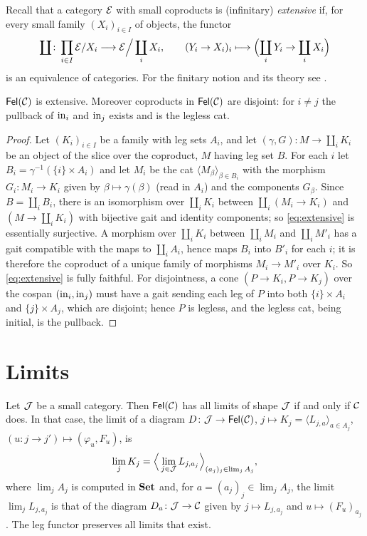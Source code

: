 Recall that a category $\mathcal{E}$ with small coproducts is (infinitary)
\emph{extensive} if, for every small family $(X_i)_{i\in I}$ of objects, the
functor
\begin{equation}\label{eq:extensive}
\coprod\colon\prod_{i\in I}\mathcal{E}/X_i\longrightarrow\mathcal{E}\Big/\coprod_iX_i,\qquad (Y_i\to X_i)_i\longmapsto\Bigl(\coprod_iY_i\to\coprod_iX_i\Bigr)
\end{equation}
is an equivalence of categories. For the finitary notion and its theory see
\cite{CarboniLackWalters1993}.

\begin{proposition}\label{prop:extensive}
$\mathsf{Fel}(\mathcal{C})$ is extensive. Moreover coproducts in $\mathsf{Fel}(\mathcal{C})$ are disjoint: for
$i\neq j$ the pullback of $\mathrm{in}_i$ and $\mathrm{in}_j$ exists and is the legless cat.
\end{proposition}

\begin{proof}
Let $(K_i)_{i\in I}$ be a family with leg sets $A_i$, and let
$(\gamma,G)\colon M\to\coprod_iK_i$ be an object of the slice over the
coproduct, $M$ having leg set $B$. For each $i$ let $B_i=\gamma^{-1}(\{i\}\times A_i)$
and let $M_i$ be the cat $\langle M_\beta\rangle_{\beta\in B_i}$ with the morphism
$G_i\colon M_i\to K_i$ given by $\beta\mapsto\gamma(\beta)$ (read in $A_i$) and
the components $G_\beta$. Since $B=\coprod_iB_i$, there is an isomorphism over
$\coprod_iK_i$ between $\coprod_i(M_i\to K_i)$ and $(M\to\coprod_iK_i)$ with
bijective gait and identity components; so \eqref{eq:extensive} is essentially
surjective. A morphism over $\coprod_iK_i$ between $\coprod_iM_i$ and
$\coprod_iM'_i$ has a gait compatible with the maps to $\coprod_iA_i$, hence
maps $B_i$ into $B'_i$ for each $i$; it is therefore the coproduct of a unique
family of morphisms $M_i\to M'_i$ over $K_i$. So \eqref{eq:extensive} is fully
faithful. For disjointness, a cone $(P\to K_i,P\to K_j)$ over the cospan
$(\mathrm{in}_i,\mathrm{in}_j)$ must have a gait sending each leg of $P$ into both
$\{i\}\times A_i$ and $\{j\}\times A_j$, which are disjoint; hence $P$ is
legless, and the legless cat, being initial, is the pullback.
\end{proof}

\section{Limits}\label{sec:limits}

\begin{theorem}\label{thm:limits}
Let $\mathcal{J}$ be a small category. Then $\mathsf{Fel}(\mathcal{C})$ has all limits of shape $\mathcal{J}$
if and only if $\mathcal{C}$ does. In that case, the limit of a diagram
$D\colon\mathcal{J}\to\mathsf{Fel}(\mathcal{C})$, $j\mapsto K_j=\langle L_{j,a}\rangle_{a\in A_j}$,
$(u\colon j\to j')\mapsto(\varphi_u,F_u)$, is
\[
\lim_{j}K_j=\Bigl\langle\,\lim_{j\in\mathcal{J}}L_{j,a_j}\Bigr\rangle_{(a_j)_j\in\lim_jA_j},
\]
where $\lim_jA_j$ is computed in $\mathbf{Set}$ and, for $a=(a_j)_j\in\lim_jA_j$, the
limit $\lim_jL_{j,a_j}$ is that of the diagram $D_a\colon\mathcal{J}\to\mathcal{C}$ given by
$j\mapsto L_{j,a_j}$ and $u\mapsto(F_u)_{a_j}$. The leg functor preserves all
limits that exist.
\end{theorem}

